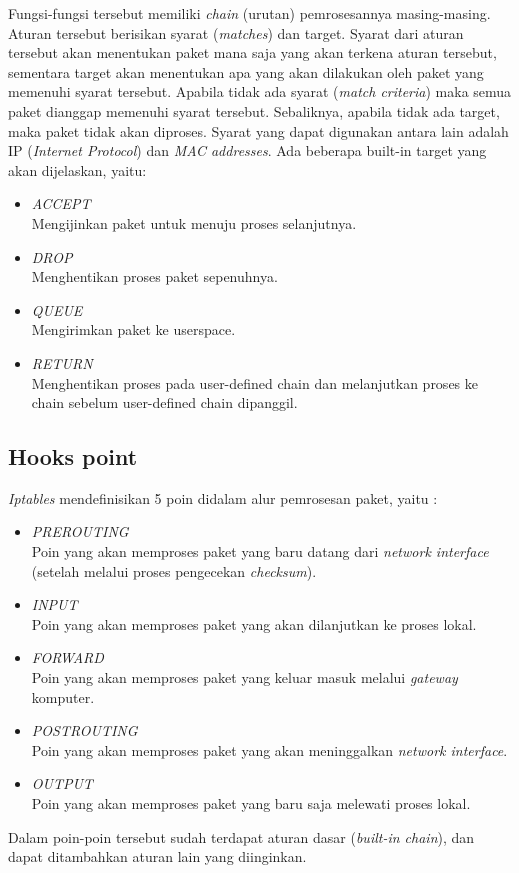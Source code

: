Fungsi-fungsi tersebut memiliki \textit{chain} (urutan) pemrosesannya masing-masing. Aturan tersebut berisikan syarat (\textit{matches}) dan target. Syarat dari aturan tersebut akan menentukan paket mana saja yang akan terkena aturan tersebut, sementara target akan menentukan apa yang akan dilakukan oleh paket yang memenuhi syarat tersebut. Apabila tidak ada syarat (\textit{match criteria}) maka semua paket dianggap memenuhi syarat tersebut. Sebaliknya, apabila tidak ada target, maka paket tidak akan diproses. Syarat yang dapat digunakan antara lain adalah IP (\textit{Internet Protocol}) dan \textit{MAC addresses}.
Ada beberapa built-in target yang akan dijelaskan, yaitu:
\begin{itemize}
	\item \textit{ACCEPT}\\
	Mengijinkan paket untuk menuju proses selanjutnya.
	\item \textit{DROP}\\
	Menghentikan proses paket sepenuhnya.
	\item \textit{QUEUE}\\
	Mengirimkan paket ke userspace.
	\item \textit{RETURN}\\
	Menghentikan proses pada user-defined chain dan melanjutkan proses ke chain sebelum user-defined chain dipanggil.
\end{itemize}
\subsection{Hooks point}
\textit{Iptables} mendefinisikan 5 poin didalam alur pemrosesan paket, yaitu :
\begin{itemize}
	\item \textit{PREROUTING}\\
	Poin yang akan memproses paket yang baru datang dari \textit{network interface} (setelah melalui proses pengecekan \textit{checksum}).
	\item \textit{INPUT}\\
	Poin yang akan memproses paket yang akan dilanjutkan ke proses lokal.
	\item \textit{FORWARD}\\
	Poin yang akan memproses paket yang keluar masuk melalui \textit{gateway} komputer.
	\item \textit{POSTROUTING}\\
	Poin yang akan memproses paket yang akan meninggalkan \textit{network interface}.
	\item \textit{OUTPUT}\\
	Poin yang akan memproses paket yang baru saja melewati proses lokal.
\end{itemize}
Dalam poin-poin tersebut sudah terdapat aturan dasar (\textit{built-in chain}), dan dapat ditambahkan aturan lain yang diinginkan.

